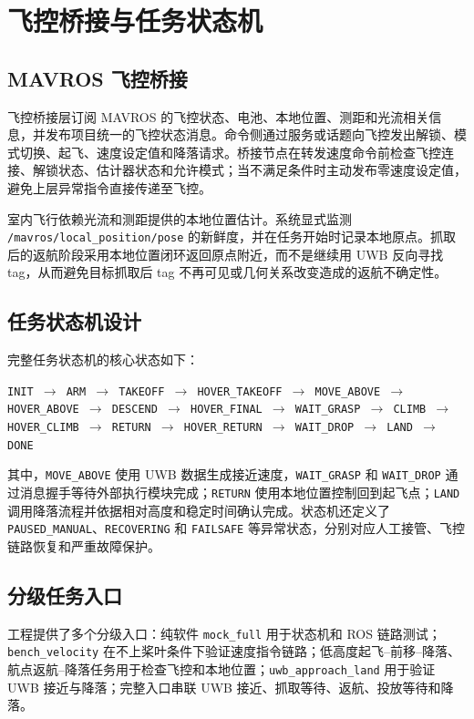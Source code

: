\documentclass[12pt,a4paper]{ctexart}
\providecommand{\allowbreak}{\penalty0\relax}
\begin{document}
\clearpage
\section{飞控桥接与任务状态机}
\subsection{MAVROS 飞控桥接}
飞控桥接层订阅 MAVROS 的飞控状态、电池、本地位置、测距和光流相关信息，并发布项目统一的飞控状态消息。命令侧通过服务或话题向飞控发出解锁、模式切换、起飞、速度设定值和降落请求。桥接节点在转发速度命令前检查飞控连接、解锁状态、估计器状态和允许模式；当不满足条件时主动发布零速度设定值，避免上层异常指令直接传递至飞控。

室内飞行依赖光流和测距提供的本地位置估计。系统显式监测 \texttt{/mavros/}\allowbreak\texttt{local\_position/}\allowbreak\texttt{pose} 的新鲜度，并在任务开始时记录本地原点。抓取后的返航阶段采用本地位置闭环返回原点附近，而不是继续用 UWB 反向寻找 tag，从而避免目标抓取后 tag 不再可见或几何关系改变造成的返航不确定性。

\subsection{任务状态机设计}
完整任务状态机的核心状态如下：
\begin{center}
\texttt{INIT $\rightarrow$ ARM $\rightarrow$ TAKEOFF $\rightarrow$ HOVER\_TAKEOFF $\rightarrow$ MOVE\_ABOVE $\rightarrow$ HOVER\_ABOVE $\rightarrow$ DESCEND $\rightarrow$ HOVER\_FINAL $\rightarrow$ WAIT\_GRASP $\rightarrow$ CLIMB $\rightarrow$ HOVER\_CLIMB $\rightarrow$ RETURN $\rightarrow$ HOVER\_RETURN $\rightarrow$ WAIT\_DROP $\rightarrow$ LAND $\rightarrow$ DONE}
\end{center}

其中，\texttt{MOVE\_ABOVE} 使用 UWB 数据生成接近速度，\texttt{WAIT\_GRASP} 和 \texttt{WAIT\_DROP} 通过消息握手等待外部执行模块完成；\texttt{RETURN} 使用本地位置控制回到起飞点；\texttt{LAND} 调用降落流程并依据相对高度和稳定时间确认完成。状态机还定义了 \texttt{PAUSED\_MANUAL}、\texttt{RECOVERING} 和 \texttt{FAILSAFE} 等异常状态，分别对应人工接管、飞控链路恢复和严重故障保护。

\subsection{分级任务入口}
工程提供了多个分级入口：纯软件 \texttt{mock\_full} 用于状态机和 ROS 链路测试；\texttt{bench\_velocity} 在不上桨叶条件下验证速度指令链路；低高度起飞--前移--降落、航点返航--降落任务用于检查飞控和本地位置；\texttt{uwb\_approach\_land} 用于验证 UWB 接近与降落；完整入口串联 UWB 接近、抓取等待、返航、投放等待和降落。
\end{document}
